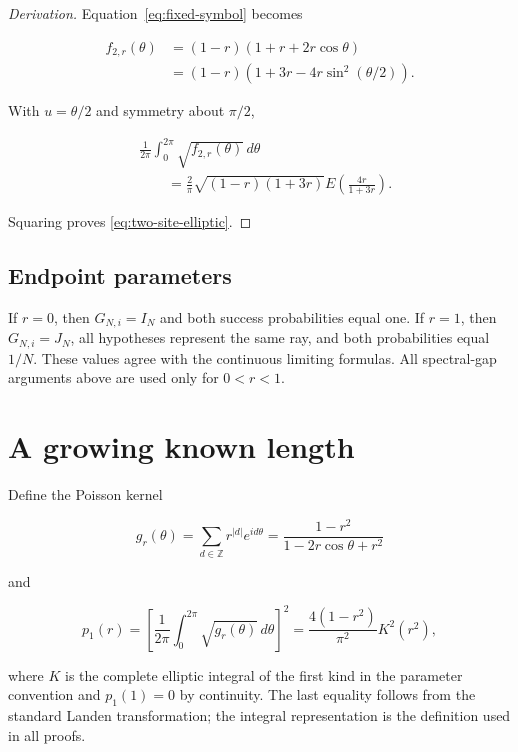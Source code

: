 \begin{proof}[Derivation]
Equation~\eqref{eq:fixed-symbol} becomes

\begin{align*}
f_{2,r}(\theta)
&=(1-r)(1+r+2r\cos\theta) \\
&=(1-r)(1+3r-4r\sin^2(\theta/2)).
\end{align*}

With \(u=\theta/2\) and symmetry about \(\pi/2\),

\begin{align*}
&\frac1{2\pi}\int_0^{2\pi}\sqrt{f_{2,r}(\theta)}\,d\theta \\
&\qquad=\frac2\pi\sqrt{(1-r)(1+3r)}
E\!\left(\frac{4r}{1+3r}\right).
\end{align*}

Squaring proves \eqref{eq:two-site-elliptic}.
\end{proof}

\subsection{Endpoint parameters}\label{endpoint-parameters}

If \(r=0\), then \(G_{N,i}=I_N\) and both success probabilities equal one. If \(r=1\), then \(G_{N,i}=J_N\), all hypotheses represent the same ray, and both probabilities equal \(1/N\). These values agree with the continuous limiting formulas. All spectral-gap arguments above are used only for \(0<r<1\).

\section{A growing known length}\label{a-growing-known-length}

Define the Poisson kernel

\[
g_r(\theta)=\sum_{d\in\mathbb Z}r^{|d|}e^{id\theta}
=\frac{1-r^2}{1-2r\cos\theta+r^2}
\]

and

\begin{equation}\label{eq:p1-definition}
p_1(r)=\left[\frac1{2\pi}\int_0^{2\pi}\sqrt{g_r(\theta)}\,d\theta\right]^2
=\frac{4(1-r^2)}{\pi^2}K^2(r^2),
\end{equation}

where \(K\) is the complete elliptic integral of the first kind in the parameter convention and \(p_1(1)=0\) by continuity. The last equality follows from the standard Landen transformation; the integral representation is the definition used in all proofs.

